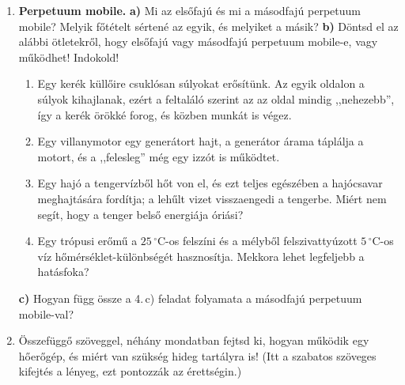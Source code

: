 \documentclass[12pt]{article}
\begin{document}
\newpage
\begin{enumerate}[start=5]
\item \textbf{Perpetuum mobile.}
  \textbf{a)} Mi az elsőfajú és mi a másodfajú perpetuum mobile? Melyik főtételt sértené
  az egyik, és melyiket a másik?
  \textbf{b)} Döntsd el az alábbi ötletekről, hogy elsőfajú vagy másodfajú perpetuum
  mobile-e, vagy működhet! Indokold!
  \begin{enumerate}
    \item Egy kerék küllőire csuklósan súlyokat erősítünk. Az egyik oldalon a súlyok
      kihajlanak, ezért a feltaláló szerint az az oldal mindig ,,nehezebb'', így a kerék
      örökké forog, és közben munkát is végez.
    \item Egy villanymotor egy generátort hajt, a generátor árama táplálja a motort, és a
      ,,felesleg'' még egy izzót is működtet.
    \item Egy hajó a tengervízből hőt von el, és ezt teljes egészében a hajócsavar
      meghajtására fordítja; a lehűlt vizet visszaengedi a tengerbe. Miért nem segít,
      hogy a tenger belső energiája óriási?
    \item Egy trópusi erőmű a $25\,^\circ$C-os felszíni és a mélyből felszivattyúzott
      $5\,^\circ$C-os víz hőmérséklet-különbségét hasznosítja. Mekkora lehet legfeljebb
      a hatásfoka?
  \end{enumerate}
  \textbf{c)} Hogyan függ össze a 4.\,c) feladat folyamata a másodfajú perpetuum
  mobile-val?

\item Összefüggő szöveggel, néhány mondatban fejtsd ki, hogyan működik egy hőerőgép, és
  miért van szükség hideg tartályra is! (Itt a szabatos szöveges kifejtés a lényeg, ezt
  pontozzák az érettségin.)
\end{enumerate}
\end{document}
